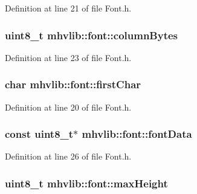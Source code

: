 Definition at line 21 of file Font.\-h.

\hypertarget{structmhvlib_1_1font_a9fd6e0570a3257e455e1ad8771a6806b}{
\subsubsection[{column\-Bytes}]{\setlength{\rightskip}{0pt plus 5cm}uint8\-\_\-t mhvlib\-::font\-::column\-Bytes}}\label{structmhvlib_1_1font_a9fd6e0570a3257e455e1ad8771a6806b}


Definition at line 23 of file Font.\-h.

\hypertarget{structmhvlib_1_1font_a0b1d1726828b96ff6a69ff4809a2d864}{
\subsubsection[{first\-Char}]{\setlength{\rightskip}{0pt plus 5cm}char mhvlib\-::font\-::first\-Char}}\label{structmhvlib_1_1font_a0b1d1726828b96ff6a69ff4809a2d864}


Definition at line 20 of file Font.\-h.

\hypertarget{structmhvlib_1_1font_aeb4011b646d2ee424d91226ceea9c00e}{
\subsubsection[{font\-Data}]{\setlength{\rightskip}{0pt plus 5cm}const uint8\-\_\-t$\ast$ mhvlib\-::font\-::font\-Data}}\label{structmhvlib_1_1font_aeb4011b646d2ee424d91226ceea9c00e}


Definition at line 26 of file Font.\-h.

\hypertarget{structmhvlib_1_1font_adf62dff1d90d212f2e8ef22c48d80682}{
\subsubsection[{max\-Height}]{\setlength{\rightskip}{0pt plus 5cm}uint8\-\_\-t mhvlib\-::font\-::max\-Height}}\label{structmhvlib_1_1font_adf62dff1d90d212f2e8ef22c48d80682}


